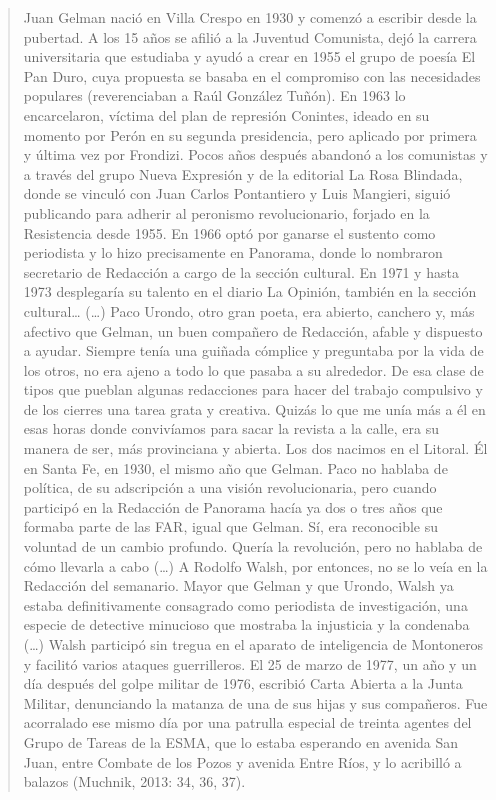 \begin{quote}
Juan Gelman nació en Villa Crespo en 1930 y comenzó a escribir desde la pubertad. A los 15 años se afilió a la Juventud Comunista, dejó la carrera universitaria que estudiaba y ayudó a crear en 1955 el grupo de poesía El Pan Duro, cuya propuesta se basaba en el compromiso con las necesidades populares (reverenciaban a Raúl González Tuñón). En 1963 lo encarcelaron, víctima del plan de represión Conintes, ideado en su momento por Perón en su segunda presidencia, pero aplicado por primera y última vez por Frondizi. Pocos años después abandonó a los comunistas y a través del grupo Nueva Expresión y de la editorial La Rosa Blindada, donde se vinculó con Juan Carlos Pontantiero y Luis Mangieri, siguió publicando para adherir al peronismo revolucionario, forjado en la Resistencia desde 1955. En 1966 optó por ganarse el sustento como periodista y lo hizo precisamente en Panorama, donde lo nombraron secretario de Redacción a cargo de la sección cultural. En 1971 y hasta 1973 desplegaría su talento en el diario La Opinión, también en la sección cultural\ldots{} (\ldots) Paco Urondo, otro gran poeta, era abierto, canchero y, más afectivo que Gelman, un buen compañero de Redacción, afable y dispuesto a ayudar. Siempre tenía una guiñada cómplice y preguntaba por la vida de los otros, no era ajeno a todo lo que pasaba a su alrededor. De esa clase de tipos que pueblan algunas redacciones para hacer del trabajo compulsivo y de los cierres una tarea grata y creativa. Quizás lo que me unía más a él en esas horas donde convivíamos para sacar la revista a la calle, era su manera de ser, más provinciana y abierta. Los dos nacimos en el Litoral. Él en Santa Fe, en 1930, el mismo año que Gelman. Paco no hablaba de política, de su adscripción a una visión revolucionaria, pero cuando participó en la Redacción de Panorama hacía ya dos o tres años que formaba parte de las FAR, igual que Gelman. Sí, era reconocible su voluntad de un cambio profundo. Quería la revolución, pero no hablaba de cómo llevarla a cabo (\ldots) A Rodolfo Walsh, por entonces, no se lo veía en la Redacción del semanario. Mayor que Gelman y que Urondo, Walsh ya estaba definitivamente consagrado como periodista de investigación, una especie de detective minucioso que mostraba la injusticia y la condenaba (\ldots) Walsh participó sin tregua en el aparato de inteligencia de Montoneros y facilitó varios ataques guerrilleros. El 25 de marzo de 1977, un año y un día después del golpe militar de 1976, escribió Carta Abierta a la Junta Militar, denunciando la matanza de una de sus hijas y sus compañeros. Fue acorralado ese mismo día por una patrulla especial de treinta agentes del Grupo de Tareas de la ESMA, que lo estaba esperando en avenida San Juan, entre Combate de los Pozos y avenida Entre Ríos, y lo acribilló a balazos (Muchnik, 2013: 34, 36, 37).
\end{quote}

